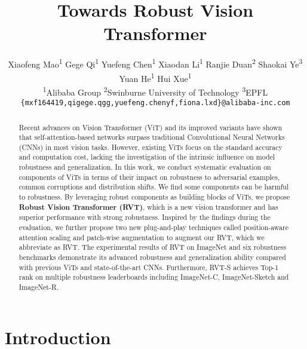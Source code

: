 \documentclass[10pt,twocolumn,letterpaper]{article}
\begin{document}
\title{Towards Robust Vision Transformer}

\author{Xiaofeng Mao\textsuperscript{1}
\quad
Gege Qi\textsuperscript{1}
\quad
Yuefeng Chen\textsuperscript{1} 
\quad
Xiaodan Li\textsuperscript{1} 
\quad
Ranjie Duan\textsuperscript{2}
\quad
Shaokai Ye\textsuperscript{3} \\
\quad
Yuan He\textsuperscript{1} 
\quad
Hui Xue\textsuperscript{1} \\
\textsuperscript{1}Alibaba Group
\quad
\textsuperscript{2}Swinburne University of Technology
\quad
\textsuperscript{3}EPFL \\
{\tt\small\{mxf164419,qigege.qgg,yuefeng.chenyf,fiona.lxd\}@alibaba-inc.com}
}

\maketitle

\begin{abstract}
Recent advances on Vision Transformer (ViT) and its improved variants have shown that self-attention-based networks surpass traditional Convolutional Neural Networks (CNNs) in most vision tasks. However, existing ViTs focus on the standard accuracy and computation cost, lacking the investigation of the intrinsic influence on model robustness and generalization. In this work, we conduct systematic evaluation on components of ViTs in terms of their impact on robustness to adversarial examples, common corruptions and distribution shifts. We find some components can be harmful to robustness. By leveraging robust components as building blocks of ViTs, we propose \textbf{Robust Vision Transformer (RVT)}, which is a new vision transformer and has superior performance with strong robustness. Inspired by the findings during the evaluation, we further propose two new plug-and-play techniques called position-aware attention scaling and patch-wise augmentation to augment our RVT, which we abbreviate as RVT. The experimental results of RVT on ImageNet and six robustness benchmarks demonstrate its advanced robustness and generalization ability compared with previous ViTs and state-of-the-art CNNs. Furthermore, RVT-S achieves Top-1 rank on multiple robustness leaderboards including ImageNet-C, ImageNet-Sketch and ImageNet-R.
\end{abstract}



\section{Introduction}
\end{document}
